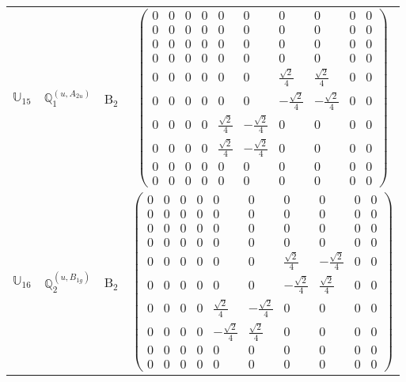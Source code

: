 \documentclass[fleqn,10pt,landscape]{article}
\begin{document}
\begin{itemize}
\begin{center}
\begin{longtable}{c|c|c|c}
$ \mathbb{U}_{15} $ & $\mathbb{Q}_{1}^{(u,A_{2u})}$ & B$_{2}$ & $\begin{pmatrix} 0 & 0 & 0 & 0 & 0 & 0 & 0 & 0 & 0 & 0 \\ 0 & 0 & 0 & 0 & 0 & 0 & 0 & 0 & 0 & 0 \\ 0 & 0 & 0 & 0 & 0 & 0 & 0 & 0 & 0 & 0 \\ 0 & 0 & 0 & 0 & 0 & 0 & 0 & 0 & 0 & 0 \\ 0 & 0 & 0 & 0 & 0 & 0 & \frac{\sqrt{2}}{4} & \frac{\sqrt{2}}{4} & 0 & 0 \\ 0 & 0 & 0 & 0 & 0 & 0 & - \frac{\sqrt{2}}{4} & - \frac{\sqrt{2}}{4} & 0 & 0 \\ 0 & 0 & 0 & 0 & \frac{\sqrt{2}}{4} & - \frac{\sqrt{2}}{4} & 0 & 0 & 0 & 0 \\ 0 & 0 & 0 & 0 & \frac{\sqrt{2}}{4} & - \frac{\sqrt{2}}{4} & 0 & 0 & 0 & 0 \\ 0 & 0 & 0 & 0 & 0 & 0 & 0 & 0 & 0 & 0 \\ 0 & 0 & 0 & 0 & 0 & 0 & 0 & 0 & 0 & 0 \end{pmatrix}$ \\
$ \mathbb{U}_{16} $ & $\mathbb{Q}_{2}^{(u,B_{1g})}$ & B$_{2}$ & $\begin{pmatrix} 0 & 0 & 0 & 0 & 0 & 0 & 0 & 0 & 0 & 0 \\ 0 & 0 & 0 & 0 & 0 & 0 & 0 & 0 & 0 & 0 \\ 0 & 0 & 0 & 0 & 0 & 0 & 0 & 0 & 0 & 0 \\ 0 & 0 & 0 & 0 & 0 & 0 & 0 & 0 & 0 & 0 \\ 0 & 0 & 0 & 0 & 0 & 0 & \frac{\sqrt{2}}{4} & - \frac{\sqrt{2}}{4} & 0 & 0 \\ 0 & 0 & 0 & 0 & 0 & 0 & - \frac{\sqrt{2}}{4} & \frac{\sqrt{2}}{4} & 0 & 0 \\ 0 & 0 & 0 & 0 & \frac{\sqrt{2}}{4} & - \frac{\sqrt{2}}{4} & 0 & 0 & 0 & 0 \\ 0 & 0 & 0 & 0 & - \frac{\sqrt{2}}{4} & \frac{\sqrt{2}}{4} & 0 & 0 & 0 & 0 \\ 0 & 0 & 0 & 0 & 0 & 0 & 0 & 0 & 0 & 0 \\ 0 & 0 & 0 & 0 & 0 & 0 & 0 & 0 & 0 & 0 \end{pmatrix}$ \\

\end{longtable}
\end{center}
\end{itemize}
\end{document}
